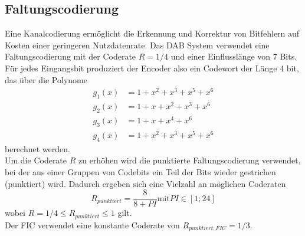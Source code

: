 \subsection{Faltungscodierung}
\label{sec:faltungscodierung}
Eine Kanalcodierung ermöglicht die Erkennung und Korrektur von Bitfehlern auf Kosten einer geringeren Nutzdatenrate. Das DAB System verwendet eine Faltungscodierung mit der Coderate $R=1/4$ und einer Einflusslänge von 7 Bits. Für jedes Eingangsbit produziert der Encoder also ein Codewort der Länge 4 bit, das über die Polynome
\begin{equation}
\begin{aligned}
g_1(x) &= 1 + x^2 + x^3 + x^5 + x^6 \\
g_2(x) &= 1 + x + x^2 + x^3 + x^6 \\
g_3(x) &= 1 + x + x^4 + x^6 \\
g_4(x) &= 1 + x^2 + x^3 + x^5 + x^6
\end{aligned}
\end{equation}
berechnet werden. \\
Um die Coderate $R$ zu erhöhen wird die punktierte Faltungscodierung verwendet, bei der aus einer Gruppen von Codebits ein Teil der Bits wieder gestrichen (punktiert) wird. Dadurch ergeben sich eine Vielzahl an möglichen Coderaten
\begin{equation}
R_{punktiert} = \frac{8}{8 + PI} \text{mit} PI \in [1;24]
\end{equation}
wobei $R = 1/4 \leq R_{punktiert} \leq 1$ gilt.\\
Der FIC verwendet eine konstante Coderate von $R_{punktiert, FIC} = 1/3$.



